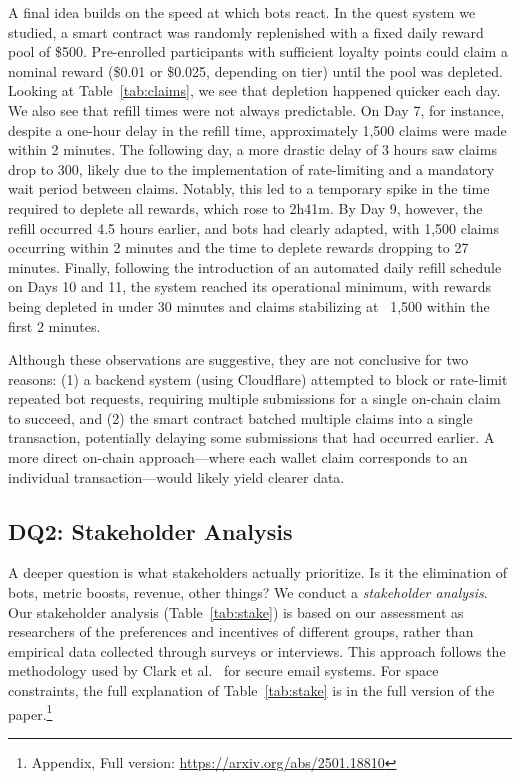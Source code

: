 A final idea builds on the speed at which bots react. In the quest system we studied, a smart contract was randomly replenished with a fixed daily reward pool of \$500. Pre-enrolled participants with sufficient loyalty points could claim a nominal reward (\$0.01 or \$0.025, depending on tier) until the pool was depleted. Looking at Table~\ref{tab:claims}, we see that depletion happened quicker each day. We also see that refill times were not always predictable. On Day 7, for instance, despite a one-hour delay in the refill time, approximately 1,500 claims were made within 2 minutes. The following day, a more drastic delay of 3 hours saw claims drop to 300, likely due to the implementation of rate-limiting and a mandatory wait period between claims. Notably, this led to a temporary spike in the time required to deplete all rewards, which rose to 2h41m. By Day 9, however, the refill occurred 4.5 hours earlier, and bots had clearly adapted, with 1,500 claims occurring within 2 minutes and the time to deplete rewards dropping to 27 minutes. Finally, following the introduction of an automated daily refill schedule on Days 10 and 11, the system reached its operational minimum, with rewards being depleted in under 30 minutes and claims stabilizing at ~1,500 within the first 2 minutes.

Although these observations are suggestive, they are not conclusive for two reasons: (1) a backend system (using Cloudflare) attempted to block or rate-limit repeated bot requests, requiring multiple submissions for a single on-chain claim to succeed, and (2) the smart contract batched multiple claims into a single transaction, potentially delaying some submissions that had occurred earlier. A more direct on-chain approach---where each wallet claim corresponds to an individual transaction---would likely yield clearer data.



\subsection{DQ2: Stakeholder Analysis} 



A deeper question is what stakeholders actually prioritize. Is it the elimination of bots, metric boosts, revenue, other things? We conduct a \textit{stakeholder analysis}. Our stakeholder analysis (Table~\ref{tab:stake}) is based on our assessment as researchers of the preferences and incentives of different groups, rather than empirical data collected through surveys or interviews. This approach follows the methodology used by Clark et al.~\cite{CvORSZ21} for secure email systems. For space constraints, the full explanation of Table~\ref{tab:stake} is in the full version of the paper.\footnote{Appendix, Full version: \url{https://arxiv.org/abs/2501.18810}}

